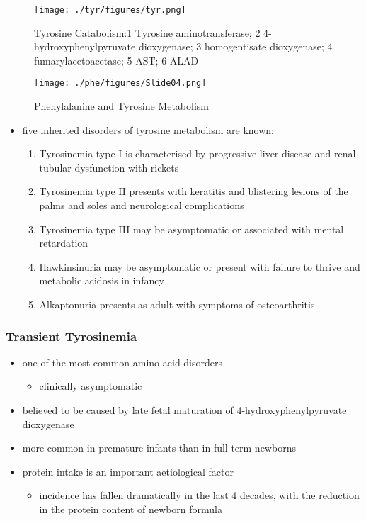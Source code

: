 \documentclass{scrartcl}
\begin{document}
\begin{figure}[htbp]
\centering
\texttt{[image: ./tyr/figures/tyr.png]}
\caption{\label{fig:org16cc1e9}
Tyrosine Catabolism:1 Tyrosine aminotransferase; 2 4-hydroxyphenylpyruvate dioxygenase; 3 homogentisate dioxygenase; 4 fumarylacetoacetase; 5 AST; 6 ALAD}
\end{figure}


\begin{figure}[htbp]
\centering
\texttt{[image: ./phe/figures/Slide04.png]}
\caption{\label{fig:org356198a}
Phenylalanine and Tyrosine Metabolism}
\end{figure}

\begin{itemize}
\item five inherited disorders of tyrosine metabolism are known:
\begin{enumerate}
\item Tyrosinemia type I is characterised by progressive
liver disease and renal tubular dysfunction with rickets
\item Tyrosinemia type II presents with keratitis and
blistering lesions of the palms and soles and neurological
complications
\item Tyrosinemia type III may be asymptomatic or associated with
mental retardation
\item Hawkinsinuria may be asymptomatic or present with failure to
thrive and metabolic acidosis in infancy
\item Alkaptonuria presents as adult with symptoms of osteoarthritis
\end{enumerate}
\end{itemize}

\subsubsection{Transient Tyrosinemia}
\label{sec:org8b12ab2}
\begin{itemize}
\item one of the most common amino acid disorders
\begin{itemize}
\item clinically asymptomatic
\end{itemize}
\item believed to be caused by late fetal maturation of
4-hydroxyphenylpyruvate dioxygenase
\item more common in premature infants than in full-term newborns
\item protein intake is an important aetiological factor
\begin{itemize}
\item incidence has fallen dramatically in the last 4 decades, with the
reduction in the protein content of newborn formula
\end{itemize}
\end{itemize}
\end{document}
